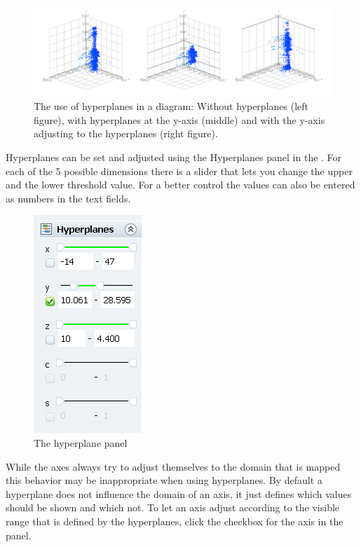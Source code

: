 %
\begin{figure}[!htb]
\begin{centering}
\includegraphics[width=1.0\columnwidth]{images/plot/hyperplane_example}
\par\end{centering}

\caption[Use of hyperplanes]{The use of hyperplanes in a diagram: Without hyperplanes (left figure),
with hyperplanes at the y-axis (middle) and with the y-axis adjusting
to the hyperplanes (right figure).}


%
\end{figure}


Hyperplanes can be set and adjusted using the Hyperplanes panel in
the \sbar. For each of the 5 possible dimensions there is a slider that
lets you change the upper and the lower threshold value. For a better
control the values can also be entered as numbers in the text fields. 

%
\begin{figure}[!htb]
\begin{centering}
\includegraphics[width=0.18\columnwidth]{images/plot/hyperplane_panel}
\par\end{centering}

\caption{The hyperplane panel}
%
\end{figure}


While the axes always try to adjust themselves to the domain that
is mapped this behavior may be inappropriate when using hyperplanes.
By default a hyperplane does not influence the domain of an axis,
it just defines which values should be shown and which not. To let
an axis adjust according to the visible range that is defined by the
hyperplanes, click the checkbox for the axis in the panel.


